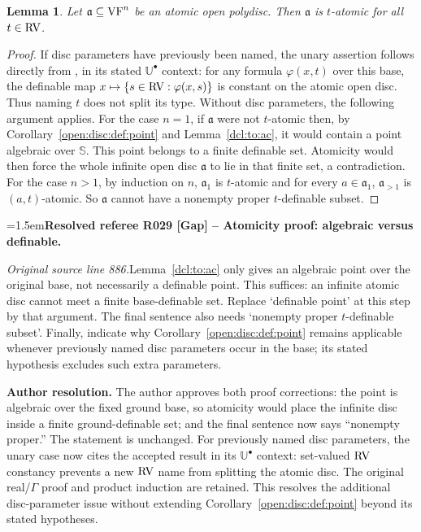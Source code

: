 \documentclass[12pt]{amsart}
\newcommand{\ResolvedRefereeRemark}[5]{%
  \par\medskip\begingroup\normalfont\small\color{gray}%
  \emergencystretch=1.5em\noindent\textbf{Resolved referee R#1 [#2] -- #3.}\par\nobreak\noindent #4\par
  \medskip\color{ResolutionGreen}\noindent\textbf{Author resolution.} #5\par
  \endgroup\medskip
}
\theoremstyle{plain}
\newtheorem{lem}[thm]{Lemma}
\theoremstyle{definition}
\theoremstyle{remark}
\numberwithin{equation}{section}
\theoremstyle{plain}
\newcommand{\VF}{\textup{VF}}
\newcommand{\RV}{\textup{RV}}
\newcommand{\ga}{\mathfrak{a}}
\newcommand{\0}{\emptyset}
\newcommand{\bb}[1]{\mathbb{#1}}
\newcommand{\sub}{\subseteq}
\begin{document}
\begin{lem}\label{at:ball:t}
Let $\ga \sub \VF^n$ be an atomic open polydisc. Then $\ga$ is $t$-atomic for all $t \in \RV$.
\end{lem}
\begin{proof}
{\color{ResolutionGreen}If disc parameters have previously been named, the unary assertion follows directly from \cite[Lemma~3.9]{Yin:int:acvf}, in its stated $\bb U^{\bullet}$ context: for any formula $\varphi(x,t)$ over this base, the definable map $x\mapsto\{s\in\RV:\varphi(x,s)\}$ is constant on the atomic open disc. Thus naming $t$ does not split its type. Without disc parameters, the following argument applies.} For the case $n=1$, if $\ga$ were not $t$-atomic then, by Corollary~\ref{open:disc:def:point} and Lemma~\ref{dcl:to:ac}, it would contain a point algebraic over $\mathbb S$. This point belongs to a finite definable set. Atomicity would then force the whole infinite open disc $\ga$ to lie in that finite set, a contradiction. For the case $n>1$, by induction on $n$, $\ga_1$ is $t$-atomic and for every $a \in \ga_1$, $\ga_{>1}$ is $(a, t)$-atomic. So $\ga$ cannot have a nonempty proper $t$-definable subset.
\end{proof}

\ResolvedRefereeRemark{029}{Gap}{Atomicity proof: algebraic versus definable}{%
\textit{Original source line 886.}\quad Lemma~\ref{dcl:to:ac} only gives an algebraic point over the original base, not necessarily a definable point. This suffices: an infinite atomic disc cannot meet a finite base-definable set. Replace `definable point' at this step by that argument. The final sentence also needs `nonempty proper $t$-definable subset'. Finally, indicate why Corollary~\ref{open:disc:def:point} remains applicable whenever previously named disc parameters occur in the base; its stated hypothesis excludes such extra parameters.
}{The author approves both proof corrections: the point is algebraic over the fixed ground base, so atomicity would place the infinite disc inside a finite ground-definable set; and the final sentence now says ``nonempty proper.'' The statement is unchanged. For previously named disc parameters, the unary case now cites the accepted result \cite[Lemma~3.9]{Yin:int:acvf} in its $\bb U^{\bullet}$ context: set-valued $\RV$ constancy prevents a new $\RV$ name from splitting the atomic disc. The original real/$\Gamma$ proof and product induction are retained. This resolves the additional disc-parameter issue without extending Corollary~\ref{open:disc:def:point} beyond its stated hypotheses.}
\end{document}
